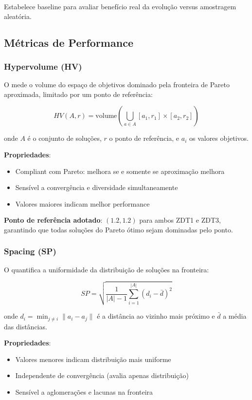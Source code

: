 Estabelece baseline para avaliar benefício real da evolução versus amostragem aleatória.

\subsection{Métricas de Performance}

\subsubsection{Hypervolume (HV)}

O \hlv{} mede o volume do espaço de objetivos dominado pela fronteira de Pareto aproximada, limitado por um ponto de referência:

$$HV(A, r) = \text{volume}\left(\bigcup_{a \in A} [a_1, r_1] \times [a_2, r_2]\right)$$

onde $A$ é o conjunto de soluções, $r$ o ponto de referência, e $a_i$ os valores objetivos.

\textbf{Propriedades}:
\begin{itemize}
    \item Compliant com Pareto: melhora se e somente se aproximação melhora
    \item Sensível a convergência e diversidade simultaneamente
    \item Valores maiores indicam melhor performance
\end{itemize}

\textbf{Ponto de referência adotado}: $(1.2, 1.2)$ para ambos ZDT1 e ZDT3, garantindo que todas soluções do Pareto ótimo sejam dominadas pelo ponto.

\subsubsection{Spacing (SP)}

O \spac{} quantifica a uniformidade da distribuição de soluções na fronteira:

$$SP = \sqrt{\frac{1}{|A|-1}\sum_{i=1}^{|A|} (d_i - \bar{d})^2}$$

onde $d_i = \min_{j \neq i} \|a_i - a_j\|$ é a distância ao vizinho mais próximo e $\bar{d}$ a média das distâncias.

\textbf{Propriedades}:
\begin{itemize}
    \item Valores menores indicam distribuição mais uniforme
    \item Independente de convergência (avalia apenas distribuição)
    \item Sensível a aglomerações e lacunas na fronteira
\end{itemize}

